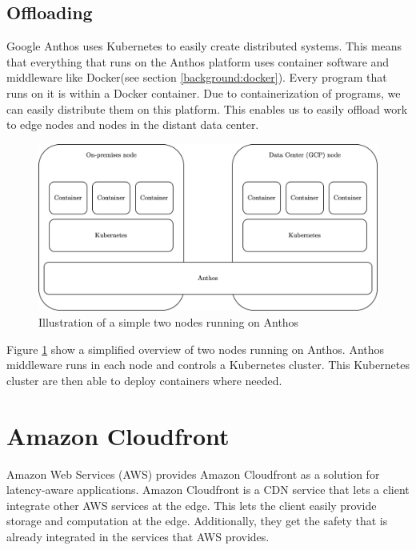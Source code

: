 \subsection{Offloading}
Google Anthos uses Kubernetes\cite{noauthor_production-grade_nodate} to easily create distributed systems\cite{noauthor_anthos_nodate}. This means that everything that runs on the Anthos platform uses container software and middleware like Docker(see section \ref{background:docker}). Every program that runs on it is within a Docker container. Due to containerization of programs, we can easily distribute them on this platform. This enables us to easily offload work to edge nodes and nodes in the distant data center.
\begin{figure}[t]
    \centering
    \includegraphics[scale=0.9]{chapters/4_architectures/figures/anthos_architecture.png}
    \caption{Illustration of a simple two nodes running on Anthos}
    \label{fig:Anthos_architecture}
\end{figure}
Figure \ref{fig:Anthos_architecture} show a simplified overview of two nodes running on Anthos. Anthos middleware runs in each node and controls a Kubernetes cluster. This Kubernetes cluster are then able to deploy containers where needed.



\section{Amazon Cloudfront}
Amazon Web Services (AWS) provides Amazon Cloudfront as a solution for latency-aware applications\cite{noauthor_production-grade_nodate}. Amazon Cloudfront is a CDN service that lets a client integrate other AWS services at the edge. This lets the client easily provide storage and computation at the edge. Additionally, they get the safety that is already integrated in the services that AWS provides. 

